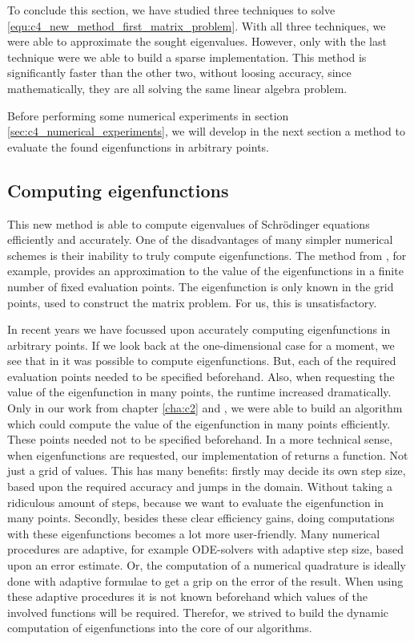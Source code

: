 To conclude this section, we have studied three techniques to solve \eqref{equ:c4_new_method_first_matrix_problem}. With all three techniques, we were able to approximate the sought eigenvalues. However, only with the last technique were we able to build a sparse implementation. This method is significantly faster than the other two, without loosing accuracy, since mathematically, they are all solving the same linear algebra problem.

Before performing some numerical experiments in section \ref{sec:c4_numerical_experiments}, we will develop in the next section a method to evaluate the found eigenfunctions in arbitrary points.

\subsection{Computing eigenfunctions}

This new method is able to compute eigenvalues of Schrödinger equations efficiently and accurately. One of the disadvantages of many simpler numerical schemes is their inability to truly compute eigenfunctions. The method from \cite{wang_new_2009}, for example, provides an approximation to the value of the eigenfunctions in a finite number of fixed evaluation points. The eigenfunction is only known in the grid points, used to construct the matrix problem. For us, this is unsatisfactory.

In recent years we have focussed upon accurately computing eigenfunctions in arbitrary points. If we look back at the one-dimensional case for a moment, we see that in  \cite{ledoux_matslise_2016} it was possible to compute eigenfunctions. But, each of the required evaluation points needed to be specified beforehand. Also, when requesting the value of the eigenfunction in many points, the runtime increased dramatically. Only in our work from chapter \ref{cha:c2} and \cite{baeyens_fast_2020}, we were able to build an algorithm which could compute the value of the eigenfunction in many points efficiently. These points needed not to be specified beforehand. In a more technical sense, when eigenfunctions are requested, our implementation of \matslise{} returns a function. Not just a grid of values. This has many benefits: firstly \matslise{} may decide its own step size, based upon the required accuracy and jumps in the domain. Without taking a ridiculous amount of steps, because we want to evaluate the eigenfunction in many points. Secondly, besides these clear efficiency gains, doing computations with these eigenfunctions becomes a lot more user-friendly. Many numerical procedures are adaptive, for example ODE-solvers with adaptive step size, based upon an error estimate. Or, the computation of a numerical quadrature is ideally done with adaptive formulae to get a grip on the error of the result. When using these adaptive procedures it is not known beforehand which values of the involved functions will be required. Therefor, we strived to build the dynamic computation of eigenfunctions into the core of our algorithms.

